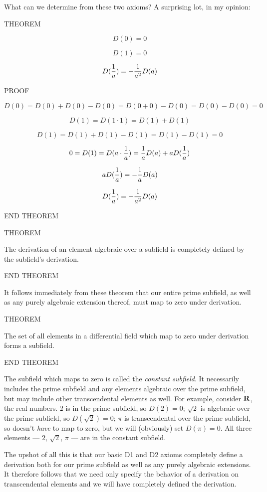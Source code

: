 What can we determine from these two axioms?  A surprising lot,
in my opinion:

THEOREM

$$D(0) = 0$$

$$D(1) = 0$$

$$ D({1\over a}) = - {1\over a^2}D(a)$$

PROOF

$$D(0) = D(0) + D(0) - D(0) = D(0+0) - D(0) = D(0) - D(0) = 0$$

$$D(1) = D(1\cdot1) = D(1) + D(1)$$

$$D(1) = D(1) + D(1) - D(1) = D(1) - D(1) = 0$$

$$0 = D(1) = D(a\cdot{1\over a}) = {1\over a} D(a) + a D({1\over a})$$

$$ a D({1\over a}) = - {1\over a}D(a)$$

$$ D({1\over a}) = - {1\over a^2}D(a)$$

END THEOREM

THEOREM

The derivation of an element algebraic over a subfield is completely
defined by the subfield's derivation.

END THEOREM

It follows immediately from these theorem that our entire prime
subfield, as well as any purely algebraic extension thereof, must map
to zero under derivation.

THEOREM

The set of all elements in a differential field which map to zero
under derivation forms a subfield.

END THEOREM

The subfield which maps to zero is called the {\it constant subfield}.
It necessarily includes the prime subfield and any elements algebraic
over the prime subfield, but may include other transcendental elements
as well.  For example, consider ${\bf R}$, the real numbers.  $2$ is
in the prime subfield, so $D(2)=0$; $\sqrt{2}$ is algebraic over the
prime subfield, so $D({\sqrt 2})=0$; $\pi$ is transcendental over the
prime subfield, so doesn't {\it have} to map to zero, but we will
(obviously) set $D(\pi)=0$.  All three elements --- $2$, ${\sqrt 2}$,
$\pi$ --- are in the constant subfield.

The upshot of all this is that our basic D1 and D2 axioms completely
define a derivation both for our prime subfield as well as any purely
algebraic extensions.  It therefore follows that we need only specify
the behavior of a derivation on transcendental elements and we will
have completely defined the derivation.

